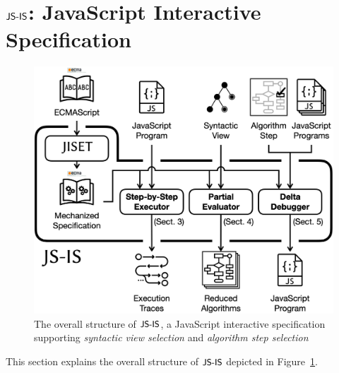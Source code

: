 \section{$\textsf{JS-IS}$: JavaScript Interactive Specification}\label{sec:overview}

\begin{figure}
  \centering
  \includegraphics[width=\columnwidth]{img/overall.png}
  \caption{The overall structure of $\textsf{\small JS-IS}$, a JavaScript interactive
    specification supporting \textit{syntactic view selection} and
  \textit{algorithm step selection}}
  \label{fig:overall}
\end{figure}

This section explains the overall structure of $\textsf{\small JS-IS}$ depicted in
Figure~\ref{fig:overall}. \todo
